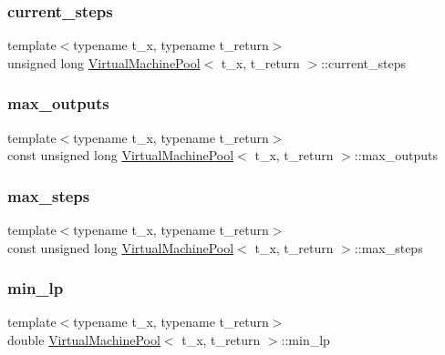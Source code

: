\subsubsection{\texorpdfstring{current\+\_\+steps}{current\_steps}}
{\footnotesize\ttfamily template$<$typename t\+\_\+x, typename t\+\_\+return$>$ \\
unsigned long \hyperlink{class_virtual_machine_pool}{Virtual\+Machine\+Pool}$<$ t\+\_\+x, t\+\_\+return $>$\+::current\+\_\+steps}

\mbox{\label{class_virtual_machine_pool_ad32df5f3c78137c35a4fcc22916c8598}} 
\subsubsection{\texorpdfstring{max\+\_\+outputs}{max\_outputs}}
{\footnotesize\ttfamily template$<$typename t\+\_\+x, typename t\+\_\+return$>$ \\
const unsigned long \hyperlink{class_virtual_machine_pool}{Virtual\+Machine\+Pool}$<$ t\+\_\+x, t\+\_\+return $>$\+::max\+\_\+outputs}

\mbox{\label{class_virtual_machine_pool_ae87303ebbcbff239ff4f3217087420a9}} 
\subsubsection{\texorpdfstring{max\+\_\+steps}{max\_steps}}
{\footnotesize\ttfamily template$<$typename t\+\_\+x, typename t\+\_\+return$>$ \\
const unsigned long \hyperlink{class_virtual_machine_pool}{Virtual\+Machine\+Pool}$<$ t\+\_\+x, t\+\_\+return $>$\+::max\+\_\+steps}

\mbox{\label{class_virtual_machine_pool_a3705ed3241bdd47aa2e585cfd67509d6}} 
\subsubsection{\texorpdfstring{min\+\_\+lp}{min\_lp}}
{\footnotesize\ttfamily template$<$typename t\+\_\+x, typename t\+\_\+return$>$ \\
double \hyperlink{class_virtual_machine_pool}{Virtual\+Machine\+Pool}$<$ t\+\_\+x, t\+\_\+return $>$\+::min\+\_\+lp}

